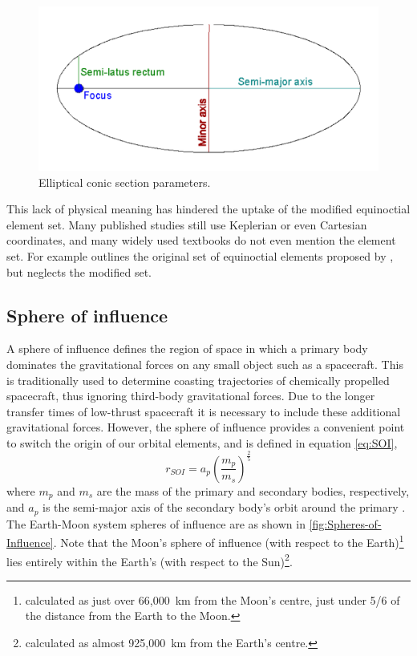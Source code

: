 \begin{figure}[h]
\caption{Elliptical conic section parameters.}
\label{fig:Elliptical-Conic-Section}
\centering
\includegraphics[scale=0.35]{Images/ellipse_parameters.pdf}
\end{figure}

This lack of physical meaning has hindered the uptake of the modified equinoctial element set. Many published studies still use Keplerian or even Cartesian coordinates, and many widely used textbooks do not even mention the element set. For example \textcite[][p. 194]{Chobotov2002} outlines the original set of equinoctial elements proposed by \textcite{Broucke1972}, but neglects the modified set.

\subsection{Sphere of influence}\label{sub:SOI}
A sphere of influence defines the region of space in which a primary body dominates the gravitational forces on any small object such as a spacecraft. This is traditionally used to determine coasting trajectories of chemically propelled spacecraft, thus ignoring third-body gravitational forces. Due to the longer transfer times of low-thrust spacecraft it is necessary to include these additional gravitational forces. However, the sphere of influence provides a convenient point to switch the origin of our orbital elements, and is defined in equation \eqref{eq:SOI},
\begin{equation}
r_{SOI}=a_{p}\left(\frac{m_{p}}{m_{s}}\right)^{\frac{2}{5}} \label{eq:SOI}
\end{equation}
where $m_{p}$ and $m_{s}$ are the mass of the primary and secondary bodies, respectively, and $a_{p}$ is the semi-major axis of the secondary body's orbit around the primary \parencite{Kemble2006}. The Earth-Moon system spheres of influence are as shown in \autoref{fig:Spheres-of-Influence}.
 Note that the Moon's sphere of influence (with respect to the Earth)\footnote{calculated as just over 66,000~km from the Moon's centre, just under 5/6 of the distance from the Earth to the Moon.} lies entirely within the Earth's (with respect to the Sun)\footnote{calculated as almost 925,000~km from the Earth's centre.}.

